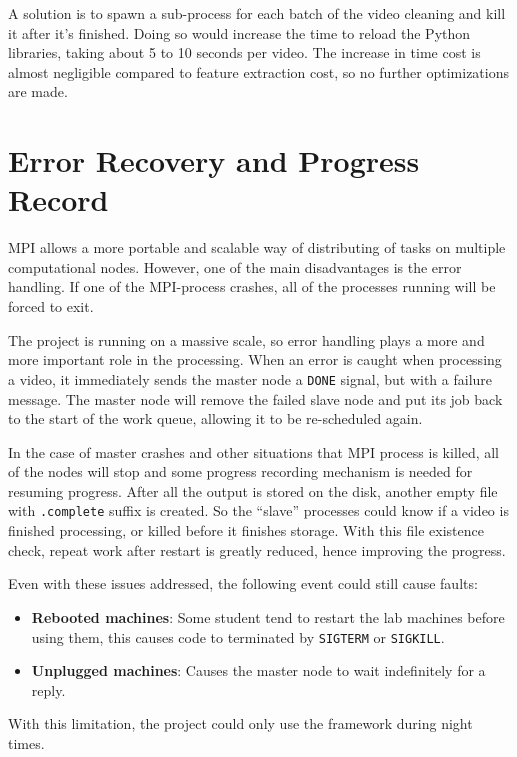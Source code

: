 \documentclass[bsc,logo,twoside,fullspacing,parskip]{infthesis}
\begin{document}
A solution is to spawn a sub-process for each batch of the video cleaning and kill it after it's finished. 
Doing so would increase the time to reload the Python libraries, taking about 5 to 10 seconds per video. 
The increase in time cost is almost negligible compared to feature extraction cost, so no further optimizations are made. 


\section{Error Recovery and Progress Record}

MPI allows a more portable and scalable way of distributing of tasks on multiple computational nodes.
However, one of the main disadvantages is the error handling. 
If one of the MPI-process crashes, all of the processes running will be forced to exit.

The project is running on a massive scale, so error handling plays a more and more important role in the processing. 
When an error is caught when processing a video, it immediately sends the master node a {\tt DONE} signal, but with a failure message. The master node will remove the failed slave node and put its job back to the start of the work queue, allowing it to be re-scheduled again.

In the case of master crashes and other situations that MPI process is killed, all of the nodes will stop and some progress recording mechanism is needed for resuming progress. After all the output is stored on the disk, another empty file with {\tt .complete} suffix is created. So the ``slave'' processes could know if a video is finished processing, or killed before it finishes storage. With this file existence check, repeat work after restart is greatly reduced, hence improving the progress.

Even with these issues addressed, the following event could still cause faults:
\begin{itemize}
\setlength{\parskip}{0pt}
\item \textbf{Rebooted machines}: Some student tend to restart the lab machines before using them, this causes code to terminated by {\tt SIGTERM} or {\tt SIGKILL}.
\item \textbf{Unplugged machines}: Causes the master node to wait indefinitely for a reply.
\end{itemize}
With this limitation, the project could only use the framework during night times.
\end{document}
